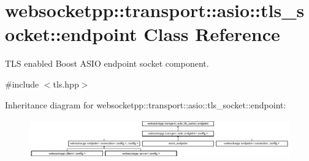 \hypertarget{classwebsocketpp_1_1transport_1_1asio_1_1tls__socket_1_1endpoint}{}\section{websocketpp\+:\+:transport\+:\+:asio\+:\+:tls\+\_\+socket\+:\+:endpoint Class Reference}
\label{classwebsocketpp_1_1transport_1_1asio_1_1tls__socket_1_1endpoint}


T\+LS enabled Boost A\+S\+IO endpoint socket component.  




{\ttfamily \#include $<$tls.\+hpp$>$}

Inheritance diagram for websocketpp\+:\+:transport\+:\+:asio\+:\+:tls\+\_\+socket\+:\+:endpoint\+:\begin{figure}[H]
\begin{center}
\leavevmode
\includegraphics[height=1.666667cm]{classwebsocketpp_1_1transport_1_1asio_1_1tls__socket_1_1endpoint}
\end{center}
\end{figure}
